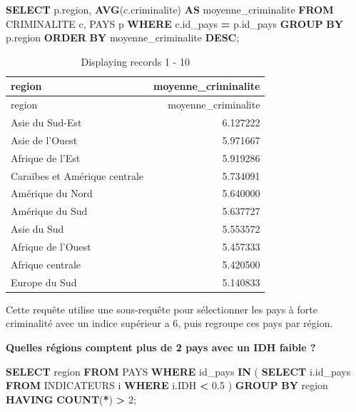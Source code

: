 \documentclass[mstat,12pt]{unswthesis}
\newenvironment{Shaded}{\begin{snugshade}}{\end{snugshade}}
\newcommand{\DecValTok}[1]{\textcolor[rgb]{0.00,0.00,0.81}{#1}}
\newcommand{\FloatTok}[1]{\textcolor[rgb]{0.00,0.00,0.81}{#1}}
\newcommand{\FunctionTok}[1]{\textcolor[rgb]{0.13,0.29,0.53}{\textbf{#1}}}
\newcommand{\KeywordTok}[1]{\textcolor[rgb]{0.13,0.29,0.53}{\textbf{#1}}}
\newcommand{\NormalTok}[1]{#1}
\newcommand{\OperatorTok}[1]{\textcolor[rgb]{0.81,0.36,0.00}{\textbf{#1}}}
\begin{document}
\medskip
\medskip

\begin{Shaded}
\begin{Highlighting}[]
\KeywordTok{SELECT}\NormalTok{ p.region, }\FunctionTok{AVG}\NormalTok{(c.criminalite) }\KeywordTok{AS}\NormalTok{ moyenne\_criminalite}
\KeywordTok{FROM}\NormalTok{ CRIMINALITE c, PAYS p}
\KeywordTok{WHERE}\NormalTok{ c.id\_pays }\OperatorTok{=}\NormalTok{ p.id\_pays}
\KeywordTok{GROUP} \KeywordTok{BY}\NormalTok{ p.region}
\KeywordTok{ORDER} \KeywordTok{BY}\NormalTok{ moyenne\_criminalite }\KeywordTok{DESC}\NormalTok{;}
\end{Highlighting}
\end{Shaded}

\begin{longtable}[]{@{}lr@{}}
\caption{Displaying records 1 - 10}\tabularnewline
\toprule\noalign{}
region & moyenne\_criminalite \\
\midrule\noalign{}
\endfirsthead
\toprule\noalign{}
region & moyenne\_criminalite \\
\midrule\noalign{}
\endhead
\bottomrule\noalign{}
\endlastfoot
Asie du Sud-Est & 6.127222 \\
Asie de l'Ouest & 5.971667 \\
Afrique de l'Est & 5.919286 \\
Caraïbes et Amérique centrale & 5.734091 \\
Amérique du Nord & 5.640000 \\
Amérique du Sud & 5.637727 \\
Asie du Sud & 5.553572 \\
Afrique de l'Ouest & 5.457333 \\
Afrique centrale & 5.420500 \\
Europe du Sud & 5.140833 \\
\end{longtable}

Cette requête utilise une sous-requête pour sélectionner les pays à
forte criminalité avec un indice supérieur a 6, puis regroupe ces pays
par région.

\textbf{Quelles régions comptent plus de 2 pays avec un IDH faible ?}

\medskip
\medskip

\begin{Shaded}
\begin{Highlighting}[]
\KeywordTok{SELECT}\NormalTok{ region}
\KeywordTok{FROM}\NormalTok{ PAYS}
\KeywordTok{WHERE}\NormalTok{ id\_pays }\KeywordTok{IN}\NormalTok{ (}
    \KeywordTok{SELECT}\NormalTok{ i.id\_pays}
    \KeywordTok{FROM}\NormalTok{ INDICATEURS i}
    \KeywordTok{WHERE}\NormalTok{ i.IDH }\OperatorTok{\textless{}} \FloatTok{0.5}
\NormalTok{)}
\KeywordTok{GROUP} \KeywordTok{BY}\NormalTok{ region}
\KeywordTok{HAVING} \FunctionTok{COUNT}\NormalTok{(}\OperatorTok{*}\NormalTok{) }\OperatorTok{\textgreater{}} \DecValTok{2}\NormalTok{;}
\end{Highlighting}
\end{Shaded}
\end{document}
